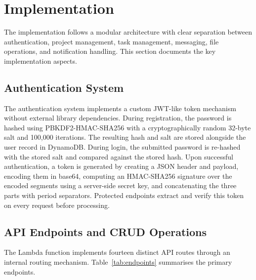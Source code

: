 \documentclass[conference]{IEEEtran}
\begin{document}
\section{Implementation}

The implementation follows a modular architecture with clear separation between authentication, project management, task management, messaging, file operations, and notification handling. This section documents the key implementation aspects.

\subsection{Authentication System}

The authentication system implements a custom JWT-like token mechanism without external library dependencies. During registration, the password is hashed using PBKDF2-HMAC-SHA256 with a cryptographically random 32-byte salt and 100,000 iterations. The resulting hash and salt are stored alongside the user record in DynamoDB. During login, the submitted password is re-hashed with the stored salt and compared against the stored hash. Upon successful authentication, a token is generated by creating a JSON header and payload, encoding them in base64, computing an HMAC-SHA256 signature over the encoded segments using a server-side secret key, and concatenating the three parts with period separators. Protected endpoints extract and verify this token on every request before processing.

\subsection{API Endpoints and CRUD Operations}

The Lambda function implements fourteen distinct API routes through an internal routing mechanism. Table~\ref{tab:endpoints} summarises the primary endpoints.
\end{document}
